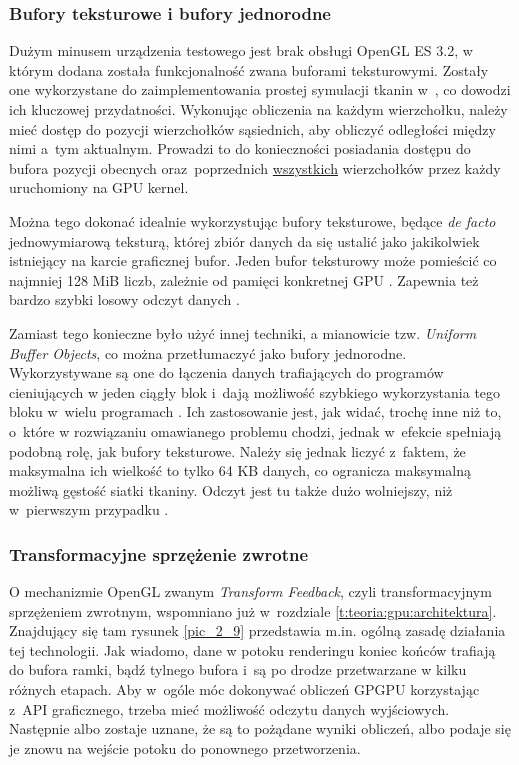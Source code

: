 			\subsubsection{Bufory teksturowe i bufory jednorodne}
			\label{t:technologie:narzedzia:bufory}
			
			Dużym minusem urządzenia testowego jest brak obsługi OpenGL ES 3.2, w którym dodana została funkcjonalność zwana buforami teksturowymi. Zostały one wykorzystane do zaimplementowania prostej symulacji tkanin w~\cite{receptury}, co dowodzi ich kluczowej przydatności. Wykonując obliczenia na każdym wierzchołku, należy mieć dostęp do pozycji wierzchołków sąsiednich, aby obliczyć odległości między nimi a~tym aktualnym. Prowadzi to do konieczności posiadania dostępu do bufora pozycji obecnych oraz~poprzednich \uline{wszystkich} wierzchołków przez każdy uruchomiony na GPU kernel.
			
			Można tego dokonać idealnie wykorzystując bufory teksturowe, będące \emph{de facto} jednowymiarową teksturą, której zbiór danych da się ustalić jako jakikolwiek istniejący na karcie graficznej bufor. Jeden bufor teksturowy może pomieścić co najmniej 128 MiB liczb, zależnie od pamięci konkretnej GPU \cite{opengl_wiki}. Zapewnia też bardzo szybki losowy odczyt danych \cite{buffers}. 
			
			Zamiast tego konieczne było użyć innej techniki, a mianowicie tzw. \emph{Uniform Buffer Objects}, co można przetłumaczyć jako bufory jednorodne. Wykorzystywane są one do łączenia danych trafiających do programów cieniujących w jeden ciągły blok i~dają możliwość szybkiego wykorzystania tego bloku w~wielu programach \cite{opengl_wiki}. Ich zastosowanie jest, jak widać, trochę inne niż to, o~które w rozwiązaniu omawianego problemu chodzi, jednak w~efekcie spełniają podobną rolę, jak bufory teksturowe. Należy się jednak liczyć z~faktem, że maksymalna ich wielkość to tylko 64 KB danych, co ogranicza maksymalną możliwą gęstość siatki tkaniny. Odczyt jest tu także dużo wolniejszy, niż w~pierwszym przypadku \cite{buffers}.
			
			\subsubsection{Transformacyjne sprzężenie zwrotne}
			\label{t:technologie:narzedzia:transformfeedback}
			
			O mechanizmie OpenGL zwanym \emph{Transform Feedback}, czyli transformacyjnym sprzężeniem zwrotnym, wspomniano już w~rozdziale \ref{t:teoria:gpu:architektura}. Znajdujący się tam rysunek \ref{pic_2_9} przedstawia m.in. ogólną zasadę działania tej technologii. Jak wiadomo, dane w potoku renderingu koniec końców trafiają do bufora ramki, bądź tylnego bufora i~są po drodze przetwarzane w kilku różnych etapach. Aby w~ogóle móc dokonywać obliczeń GPGPU korzystając z~API graficznego, trzeba mieć możliwość odczytu danych wyjściowych. Następnie albo zostaje uznane, że są to pożądane wyniki obliczeń, albo podaje się je znowu na wejście potoku do ponownego przetworzenia. 
			
